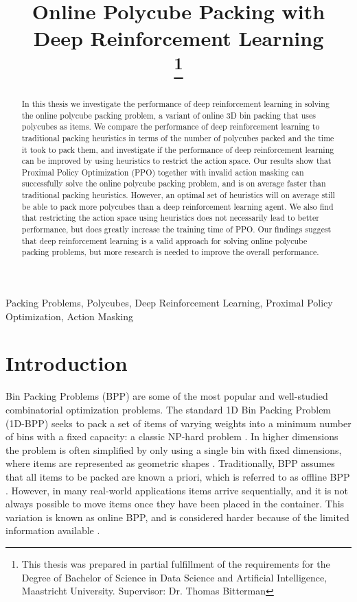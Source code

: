 \documentclass[conference]{IEEEtran}
\title{Online Polycube Packing with Deep Reinforcement Learning\\
\thanks{This thesis was prepared in partial fulfillment of the requirements for the Degree of Bachelor of Science in Data Science and Artificial Intelligence, Maastricht University. Supervisor: Dr. Thomas Bitterman}
}
\author{\IEEEauthorblockN{Thomas Vroom}
\IEEEauthorblockA{\textit{Department of Advanced Computing Sciences} \\
\textit{Faculty of Science and Engineering}\\
\textit{Maastricht University}\\
Maastricht, The Netherlands}
}
\begin{document}
\maketitle

%
%
\begin{abstract}
    In this thesis we investigate the performance of deep reinforcement learning in solving the online polycube packing problem, a variant of online 3D bin packing that uses polycubes as items.
    We compare the performance of deep reinforcement learning to traditional packing heuristics in terms of the number of polycubes packed and the time it took to pack them, and investigate if the performance of deep reinforcement learning can be improved by using heuristics to restrict the action space.
    Our results show that Proximal Policy Optimization (PPO) together with invalid action masking can successfully solve the online polycube packing problem, and is on average faster than traditional packing heuristics.
    However, an optimal set of heuristics will on average still be able to pack more polycubes than a deep reinforcement learning agent.
    We also find that restricting the action space using heuristics does not necessarily lead to better performance, but does greatly increase the training time of PPO.
    Our findings suggest that deep reinforcement learning is a valid approach for solving online polycube packing problems, but more research is needed to improve the overall performance.
\end{abstract}

\begin{IEEEkeywords}
    Packing Problems, Polycubes, Deep Reinforcement Learning, Proximal Policy Optimization, Action Masking
\end{IEEEkeywords}

%
%
\section{Introduction} \label{sec:introduction}
Bin Packing Problems (BPP) are some of the most popular and well-studied combinatorial optimization problems.
The standard 1D Bin Packing Problem (1D-BPP) seeks to pack a set of items of varying weights into a minimum number of bins with a fixed capacity: a classic NP-hard problem \cite{Korte2012}.
In higher dimensions the problem is often simplified by only using a single bin with fixed dimensions, where items are represented as geometric shapes \cite{Salih2023}.
Traditionally, BPP assumes that all items to be packed are known a priori, which is referred to as offline BPP \cite{Martello1998}.
However, in many real-world applications items arrive sequentially, and it is not always possible to move items once they have been placed in the container.
This variation is known as online BPP, and is considered harder because of the limited information available \cite{Seiden2001}.
\end{document}
